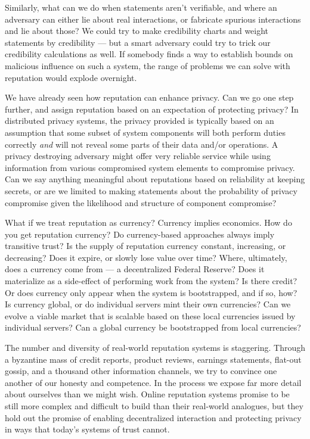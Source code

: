 \documentclass[times,10pt,twocolumn]{article}
\begin{document}
Similarly, what can we do when statements aren't verifiable, and where an
adversary can either lie about real interactions, or fabricate spurious
interactions and lie about those?  We could try to make credibility charts
and weight statements by credibility --- but a smart adversary could try to
trick our credibility calculations as well. If somebody finds a way to
establish bounds on malicious influence on such a system, the range of
problems we can solve with reputation would explode overnight.

We have already seen how reputation can enhance privacy. Can we go one step
further, and assign reputation based on an expectation of protecting
privacy? In distributed privacy systems, the privacy provided is typically
based on an assumption that some subset of system components will both
perform duties correctly {\it and} will not reveal some parts of their data
and/or operations. A privacy destroying adversary might offer very reliable
service while using information from various compromised system elements to
compromise privacy. Can we say anything meaningful about reputations based
on reliability at keeping secrets, or are we limited to making statements
about the probability of privacy compromise given the likelihood and
structure of component compromise?

What if we treat reputation as currency? Currency implies economics. How do
you get reputation currency? Do currency-based approaches always imply
transitive trust? Is the supply of reputation currency constant,
increasing, or decreasing? Does it expire, or slowly lose value over time?
Where, ultimately, does a currency come from --- a decentralized Federal
Reserve? Does it materialize as a side-effect of performing work from the
system? Is there credit? Or does currency only appear when the system is
bootstrapped, and if so, how? Is currency global, or do individual servers
mint their own currencies? Can we evolve a viable market that is scalable
based on these local currencies issued by individual servers? Can a global
currency be bootstrapped from local currencies?

The number and diversity of real-world reputation systems is staggering.
Through a byzantine mass of credit reports, product reviews, earnings
statements, flat-out gossip, and a thousand other information channels, we
try to convince one another of our honesty and competence. In the process
we expose far more detail about ourselves than we might wish. Online
reputation systems promise to be still more complex and difficult to build
than their real-world analogues, but they hold out the promise of enabling
decentralized interaction and protecting privacy in ways that today's
systems of trust cannot.



\end{document}
